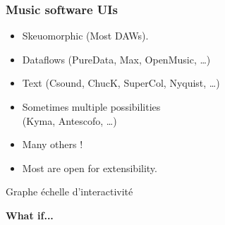 \documentclass[draft]{beamer}
\begin{document}
\begin{frame}
	\frametitle{Music software UIs}    
	\Large
	\begin{itemize}
        \item<1-> Skeuomorphic (Most DAWs).
		\item<2-> Dataflows (PureData, Max, OpenMusic, \dots)
		\item<3-> Text (Csound, ChucK, SuperCol, Nyquist, \dots)
		\item<4-> Sometimes multiple possibilities~\\ (Kyma, Antescofo, \dots)
        \item<5-> Many others !
        \item<6-> Most are open for extensibility.
	\end{itemize}
\end{frame}

\begin{frame}
    Graphe échelle d'interactivité
\end{frame}
\begin{frame}
	\Huge
    \centering
    \textbf{What if...}
\end{frame}
\end{document}
